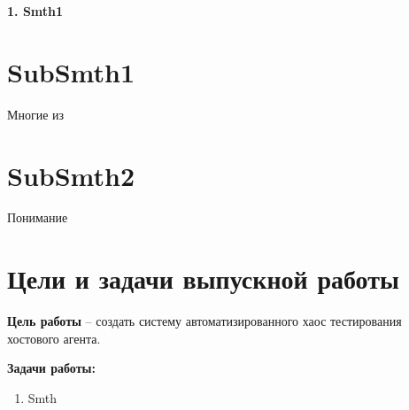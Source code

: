 \newpage
\begin{center}
  \textbf{\large 1. Smth1}
\end{center}


\section{SubSmth1}

Многие из

\section{SubSmth2}

Понимание

\section{Цели и задачи выпускной работы}\label{sec:----}

\textbf{Цель работы} -- создать систему автоматизированного хаос тестирования хостового агента. 

\textbf{Задачи работы:}
\begin{enumerate}
\item Smth
\end{enumerate}
